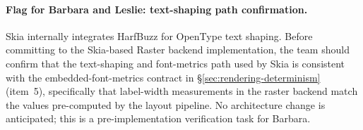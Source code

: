\paragraph{Flag for Barbara and Leslie: text-shaping path confirmation.}
Skia internally integrates HarfBuzz for OpenType text shaping.
Before committing to the Skia-based Raster backend implementation, the team should
confirm that the text-shaping and font-metrics path used by Skia is consistent with
the embedded-font-metrics contract in \S\ref{sec:rendering-determinism} (item~5),
specifically that label-width measurements in the raster backend match the values
pre-computed by the layout pipeline.
No architecture change is anticipated; this is a pre-implementation verification
task for Barbara.
